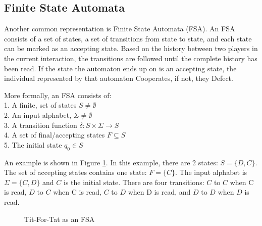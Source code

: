 \documentclass[a4paper,11pt,bcshonoursthesis,singlespace,oneside,thesisdraft,pdflatex]{cssethesis}
\begin{document}

\subsection{Finite State Automata}
\label{sec:fsa}
Another common representation is Finite State Automata (FSA). 
An FSA consists of a set of states, a set of transitions from state to state, and each state can be marked as an accepting state. 
Based on the history between two players in the current interaction, the transitions are followed until the complete history has been read. 
If the state the automaton ends up on is an accepting state, the individual represented by that automaton Cooperates, if not, they Defect. 

More formally, an FSA consists of:\\
1. A finite, set of states $S \neq  \emptyset$\\
2. An input alphabet, $\Sigma \neq  \emptyset$\\
3. A transition function $\delta : S \times \Sigma \rightarrow S$\\
4. A set of final/accepting states $F \subseteq S$ \\
5. The initial state $q_0 \in S$

An example is shown in Figure \ref{fig:fsa.tft.lang2}. 
In this example, there are 2 states: $S=\{D,C\}$. 
The set of accepting states contains one state: $F=\{C\}$. 
The input alphabet is $\Sigma=\{C,D\}$ and $C$ is the initial state. 
There are four transitions: $C$ to $C$ when C is read, $D$ to $C$ when C is read, $C$ to $D$ when D is read, and $D$ to $D$ when $D$ is read.

\begin{figure}[h]
\center
{}
\caption{Tit-For-Tat as an FSA}
\label{fig:fsa.tft.lang2}
\end{figure}
\end{document}
